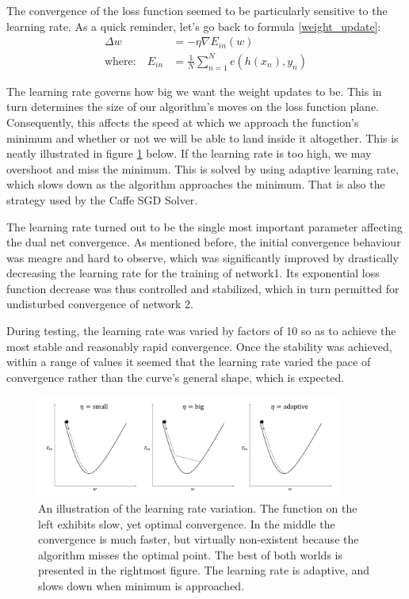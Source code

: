 \documentclass[a4paper, 12pt]{article}
\numberwithin{equation}{section}
\begin{document}
	The convergence of the loss function seemed to be particularly sensitive to the learning rate. As a quick reminder, let's go back to formula \ref{weight_update}:
	\begin{align*}
	\Delta w &= - \eta \nabla E_{in}(w) \\
	\textrm{where:} \quad E_{in} &= \frac{1}{N} \sum_{n = 1}^{N} e(h(x_n), y_n)
	\end{align*}
	
	The learning rate governs how big we want the weight updates to be. This in turn determines the size of our algorithm's moves on the loss function plane. Consequently, this affects the speed at which we approach the function's minimum and whether or not we will be able to land inside it altogether. This is neatly illustrated in figure \ref{fig:learning_rate_overshoot} below. If the learning rate is too high, we may overshoot and miss the minimum. This is solved by using adaptive learning rate, which slows down as the algorithm approaches the minimum. That is also the strategy used by the Caffe SGD Solver.	
	
	The learning rate turned out to be the single most important parameter affecting the dual net convergence. As mentioned before, the initial convergence behaviour was meagre and hard to observe, which was significantly improved by drastically decreasing the learning rate for the training of network1. Its exponential loss function decrease was thus controlled and stabilized, which in turn permitted for undisturbed convergence of network 2. 
	
	During testing, the learning rate was varied by factors of 10 so as to achieve the most stable and reasonably rapid convergence. Once the stability was achieved, within a range of values it seemed that the learning rate varied the pace of convergence rather than the curve's general shape, which is expected.
	
	\begin{figure}[!h]
		\centering
		\includegraphics[page=1,width=0.9\textwidth]{learning_rate_overshoot.pdf}
		\caption{\label{fig:learning_rate_overshoot}{An illustration of the learning rate variation. The function on the left exhibits slow, yet optimal convergence. In the middle the convergence is much faster, but virtually non-existent because the algorithm misses the optimal point. The best of both worlds is presented in the rightmost figure. The learning rate is adaptive, and slows down when minimum is approached.}}
	\end{figure}
	
\end{document}
